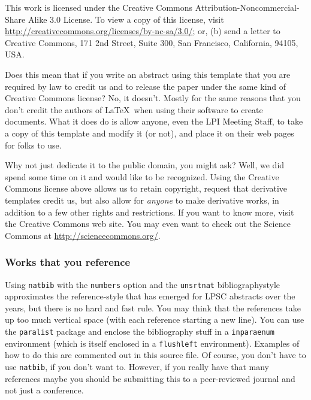 \documentclass[twoside]{article}
\begin{document}
This work is licensed under the Creative Commons
Attribution-Noncommercial-Share Alike 3.0 License. To view a copy
of this license, visit \url{http://creativecommons.org/licenses/by-nc-sa/3.0/};
or, (b) send a letter to Creative Commons, 171 2nd Street, Suite
300, San Francisco, California, 94105, USA.

Does this mean that if you write an abstract using this template that
you are required by law to credit us and to release the paper under
the same kind of Creative Commons license?  No, it doesn't.  Mostly
for the same reasons that you don't credit the authors of \LaTeX\
when using their software to create documents.  What it does do is allow
anyone, even the LPI Meeting Staff, to take a copy of this template
and modify it (or not), and place it on their web pages for folks
to use.

Why not just dedicate it to the public domain, you might ask?  Well,
we did spend some time on it and would like to be recognized.  Using
the Creative Commons license above allows us to retain copyright,
request that derivative templates credit us, but also allow for
\emph{anyone} to make derivative works, in addition to a few other
rights and restrictions.  If you want to know more, visit the
Creative Commons web site.  You may even want to check out the
Science Commons at \url{http://sciencecommons.org/}.


\subsubsection*{Works that you reference}

Using \texttt{natbib} with the \texttt{numbers} option and the
\texttt{unsrtnat} bibliographystyle approximates the reference-style
that has emerged for LPSC abstracts over the years, but there is
no hard and fast rule.  You may think that the references take up
too much vertical space (with each reference starting a new line).
You can use the \texttt{paralist} package and enclose the bibliography
stuff in a \texttt{inparaenum} environment (which is itself enclosed
in a \texttt{flushleft} environment).  Examples of how to do this
are commented out in this source file.  Of course, you don't have to 
use \texttt{natbib}, if you don't want to.  However, if you really have
that many references maybe you should be submitting this to a
peer-reviewed journal and not just a conference.



\end{document}
